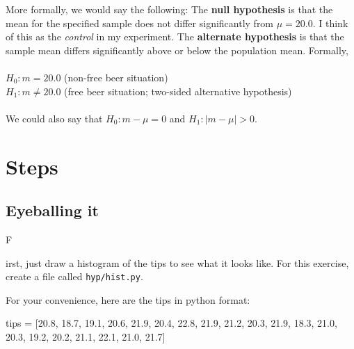 \documentclass[titlepage]{tufte-book}
\newcounter{problem}
\newcommand{\step}[1]{{}
\vspace{4pt} \noindent {\bf \theproblem. }#1\addtocounter{problem}{1}}
\begin{document}
\begin{fullwidth}
More formally, we would say the following: The {\bf null hypothesis} is that the mean for the specified sample does not differ significantly from $\mu = 20.0$.  I think of this as the {\em control} in my experiment. The {\bf alternate hypothesis} is that the sample mean differs significantly above or below the population mean.  Formally,\\
~\\
$H_0: m = 20.0$ (non-free beer situation)\\
$H_1: m \neq 20.0$ (free beer situation; two-sided alternative hypothesis)\\
~\\
\noindent We could also say that $H_0: m - \mu = 0$ and $H_1: |m-\mu| > 0$.

\section{Steps}

\subsection{Eyeballing it}

\step First, just draw a histogram of the tips to see what it looks like. For this exercise, create a file called {\tt hyp/hist.py}.


For your convenience, here are the tips in python format:

\begin{pyverbatim}
tips = [20.8, 18.7, 19.1, 20.6, 21.9, 20.4, 22.8,
        21.9, 21.2, 20.3, 21.9, 18.3, 21.0, 20.3,
        19.2, 20.2, 21.1, 22.1, 21.0, 21.7]
\end{pyverbatim}


\end{fullwidth}
\end{document}
